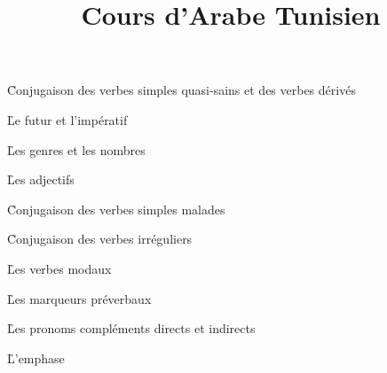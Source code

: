 \documentclass{novel}
\title     {Cours d'Arabe Tunisien}
\subtitle  {}
\begin{document}


\toc

















\h{Conjugaison des verbes simples quasi-sains et des verbes dérivés}

\h{Le futur et l'impératif}

\h{Les genres et les nombres}

\h{Les adjectifs}

\h{Conjugaison des verbes simples malades}

\h{Conjugaison des verbes irréguliers}

\h{Les verbes modaux}\label{VerbMod}

\h{Les marqueurs préverbaux}\label{MarqPVer}

\h{Les pronoms compléments directs et indirects} \label{PronCompl}

\h{L'emphase}
\label{Emphase}
\end{document}
